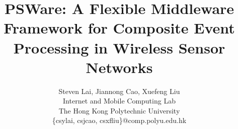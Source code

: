\title{PSWare: A Flexible Middleware Framework for Composite Event Processing in Wireless Sensor Networks}
\author{Steven Lai, Jiannong Cao, Xuefeng Liu
	\\Internet and Mobile Computing Lab
	\\ The Hong Kong Polytechnic University
	\\ \{csylai, csjcao, csxfliu\}@comp.polyu.edu.hk
}
\maketitle